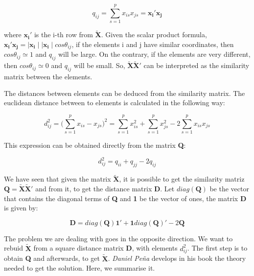 \documentclass[11pt]{report}
\begin{document}
\begin{equation} \label{qij}
q_{ij} = \sum_{s=1}^{p} x_{is}x_{js} = \mathbf{x_i'} \mathbf{x_j}
\end{equation}



where $\mathbf{x_i'}$ is the i-th row from $\mathbf{\widetilde{X}}$. 
Given the scalar product formula, $\mathbf{x_i'}\mathbf{x_j} =  \mid \mathbf{x_i} \mid \mid \mathbf{x_i} \mid cos\theta_{ij}$,
if the elements i and j have similar coordinates, then $cos\theta_{ij} \simeq 1$
and $q_{ij}$ will be large. On the contrary, if the elements are very different,
then $cos \theta_{ij} \simeq 0$ and $q_{ij}$ will be small. So, 
$\mathbf{\widetilde{X}}\mathbf{\widetilde{X}'}$ can be interpreted as the similarity
matrix between the elements.

\indent The distances between elements can be deduced from the similarity matrix.
The euclidean distance between to elements is calculated in the following way:

\begin{equation} \label{dij}
d^2_{ij} = \Big ( \sum_{s=1}^{p} x_{is}- x_{js} \Big )^2 = \sum_{s=1}^{p}x_{is}^2 + \sum_{s=1}^p x_{js}^2 - 2\sum_{s=1}^{p} x_{is}x_{js}
\end{equation}

\indent This expression can be obtained directly from the matrix \textbf{Q}:

\begin{equation} \label{dfromq}
d^2_{ij} = q_{ii} + q_{jj} - 2q_{ij}
\end{equation}

\indent We have seen that given the matrix $\mathbf{\widetilde{X}}$, it is possible to
get the similarity matriz $\mathbf{Q} = \mathbf{\widetilde{X}}\mathbf{\widetilde{X}'}$
and from it, to get the distance matrix \textbf{D}. Let $diag(\mathbf{Q})$ be the
vector that contains the diagonal terms of \textbf{Q} and \textbf{1} be the vector
of ones, the matrix \textbf{D} is given by:

$$\mathbf{D} = diag(\mathbf{Q}) \mathbf{1}' + \mathbf{1}diag(\mathbf{Q})' - 2\mathbf{Q}$$

\indent The problem we are dealing with goes in the opposite direction. We want to rebuid
$\mathbf{\widetilde{X}}$ from a square distance matrix \textbf{D}, with elements
$d_{ij}^2$. The first step is to obtain \textbf{Q} and afterwards, to get 
$\mathbf{\widetilde{X}}$. \textit{Daniel Peña} develops in his book\cite{pena_libro} the theory
needed to get the solution. Here, we summarise it.
\end{document}
